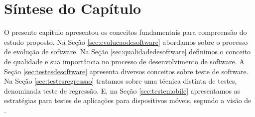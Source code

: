 \section{Síntese do Capítulo}\label{sec:sintesecapitulo}

O presente capítulo apresentou os conceitos fundamentais para compreensão do estudo proposto. Na Seção \ref{sec:evolucaodesoftware} abordamos sobre o processo de evolução de software. Na Seção \ref{sec:qualidadedesoftware} definimos o conceito de qualidade e sua importância no processo de desenvolvimento de software. A Seção \ref{sec:testesdesoftware} apresenta diversos conceitos sobre teste de software. Na Seção \ref{sec:testesregressao} tratamos sobre uma técnica distinta de testes, denominada teste de regressão. E, na Seção \ref{sec:testemobile} apresentamos as estratégias para testes de aplicações para dispositivos móveis, segundo a visão de .